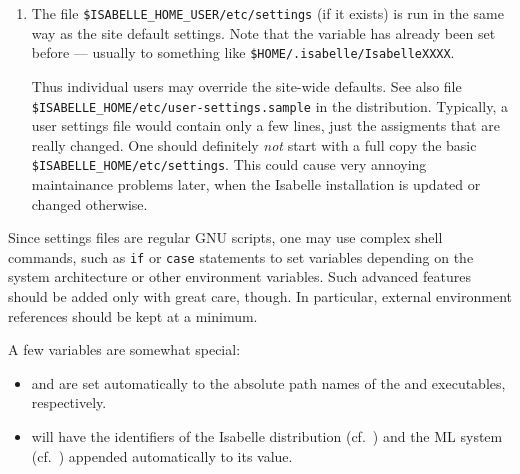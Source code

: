 \begin{isabellebody}
\begin{isamarkuptext}
\begin{enumerate}
  \item The file \verb|$ISABELLE_HOME_USER/etc/settings| (if it
  exists) is run in the same way as the site default settings. Note
  that the variable \hyperlink{setting.ISABELLE-HOME-USER}{\mbox{}} has already been set
  before --- usually to something like \verb|$HOME/.isabelle/IsabelleXXXX|.
  
  Thus individual users may override the site-wide defaults.  See also
  file \verb|$ISABELLE_HOME/etc/user-settings.sample| in the
  distribution.  Typically, a user settings file would contain only a
  few lines, just the assigments that are really changed.  One should
  definitely \emph{not} start with a full copy the basic \verb|$ISABELLE_HOME/etc/settings|. This could cause very annoying
  maintainance problems later, when the Isabelle installation is
  updated or changed otherwise.
  
  \end{enumerate}

  Since settings files are regular GNU \hypertarget{executable.bash}{\hyperlink{executable.bash}{\mbox{}}} scripts,
  one may use complex shell commands, such as \verb|if| or
  \verb|case| statements to set variables depending on the
  system architecture or other environment variables.  Such advanced
  features should be added only with great care, though. In
  particular, external environment references should be kept at a
  minimum.

  \medskip A few variables are somewhat special:

  \begin{itemize}

  \item {}\hypertarget{setting.ISABELLE-PROCESS}{\hyperlink{setting.ISABELLE-PROCESS}{\mbox{}}} and \hypertarget{setting.ISABELLE-TOOL}{\hyperlink{setting.ISABELLE-TOOL}{\mbox{}}} are set
  automatically to the absolute path names of the \hyperlink{executable.isabelle-process}{\mbox{}} and \hyperlink{executable.isabelle}{\mbox{}} executables,
  respectively.
  
  \item {}\hyperlink{setting.ISABELLE-OUTPUT}{\mbox{}} will have the identifiers of
  the Isabelle distribution (cf.\ \hyperlink{setting.ISABELLE-IDENTIFIER}{\mbox{}}) and
  the ML system (cf.\ \hyperlink{setting.ML-IDENTIFIER}{\mbox{}}) appended automatically
  to its value.


\end{itemize}
\end{isamarkuptext}
\end{isabellebody}
